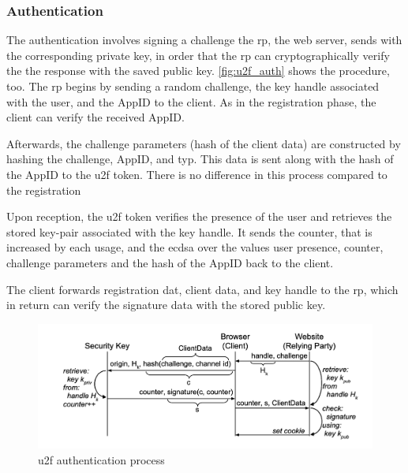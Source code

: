 \subsubsection{Authentication}

The authentication involves signing a challenge the \gls{rp}, the web server, sends with the corresponding private key, in order that the \gls{rp} can cryptographically verify the the response with the saved public key. \autoref{fig:u2f_auth} shows the procedure, too. The \gls{rp} begins by sending a random challenge, the key handle associated with the user, and the AppID to the client. As in the registration phase, the client can verify the received AppID.

Afterwards, the challenge parameters (hash of the client data) are constructed by hashing the challenge, AppID, and typ. This data is sent along with the hash of the AppID to the \gls{u2f} token. There is no difference in this process compared to the registration

Upon reception, the \gls{u2f} token verifies the presence of the user and retrieves the stored key-pair associated with the key handle.	It sends the counter, that is increased by each usage, and the \gls{ecdsa} over the values user presence, counter, challenge parameters and the hash of the AppID back to the client.

The client forwards registration dat, client data, and key handle to the \gls{rp}, which in return can verify the signature data with the stored public key.

\begin{figure}[hbt]
	\centering
	\includegraphics[width=\textwidth]{pics/u2f_auth}
	\caption[\gls{u2f} authentication process]{\gls{u2f} authentication process\footnotemark}
	\label{fig:u2f_auth}
\end{figure}

